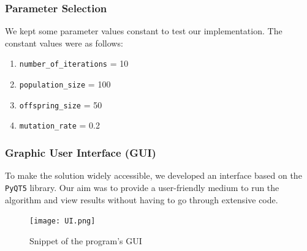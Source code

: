 \documentclass[conference,compsoc]{IEEEtran}
\begin{document}
\subsubsection{Parameter Selection}  We kept some parameter values constant to test our implementation. The constant 
values were as follows:
\begin{enumerate}
  \item \texttt{number\_of\_iterations} = 10
  \item \texttt{population\_size} = 100
  \item \texttt{offspring\_size} = 50
  \item \texttt{mutation\_rate} = 0.2 
\end{enumerate}

\subsubsection{Graphic User Interface (GUI)} To make the solution widely accessible, we developed an interface 
based on the \texttt{PyQT5} library. Our aim was to provide a user-friendly medium to run the algorithm and 
view results without having to go through extensive code.
\begin{figure}[h]
    \centering
    \texttt{[image: UI.png]}
    \caption{Snippet of the program's GUI}
    \label{fig:my_label}
\end{figure}
\end{document}
